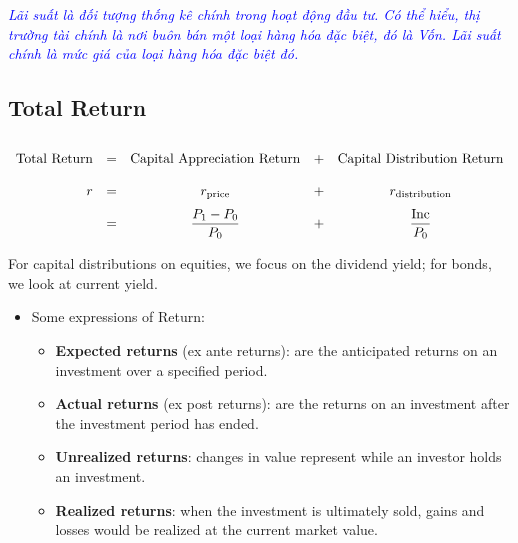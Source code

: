\textcolor{blue}{
	\textit{Lãi suất là đối tượng thống kê chính trong hoạt động đầu tư. 
Có thể hiểu, thị trường tài chính là nơi buôn bán một loại hàng hóa đặc biệt, đó là Vốn. 
Lãi suất chính là mức giá của loại hàng hóa đặc biệt đó.}}

\subsection{Total Return}
	\label{subsec:Total Return}
\begin{equation}
\renewcommand{\arraystretch}{2.0}
\begin{array}{r c c c c}
\text{Total Return} & = & \text{Capital Appreciation Return} & + & \text{Capital Distribution Return} \\
r & = & r_{\text{price}} & + & r_{\text{distribution}} \\
  & = & \dfrac{P_1-P_0}{P_0} & + & \dfrac{\text{Inc}}{P_0}
\end{array}
\label{eq:total_return}
\end{equation}

For capital distributions on equities, we focus on the dividend yield; for bonds, we look at current yield.
\begin{itemize}
	\item Some expressions of Return:
	\begin{itemize}
		\item[] \textbf{Expected returns} (ex ante returns): are the anticipated returns on an investment over a specified period.
		\item[] \textbf{Actual returns} (ex post returns): are the returns on an investment after the investment period has ended.
		\item[] \textbf{Unrealized returns}: changes in value represent while an investor holds an investment.
		\item[] \textbf{Realized returns}: when the investment is ultimately sold, gains and losses would be realized at the current market value.
	\end{itemize}
\end{itemize}

